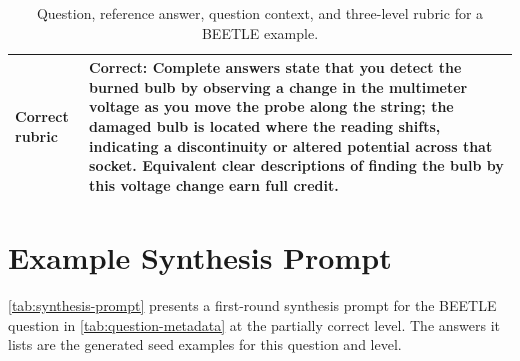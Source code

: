 \begin{table}[t]
{\begin{tabular}{@{}p{}p{}@{}}
    \hline
    \raggedright\textbf{Correct rubric} &
    Correct: Complete answers state that you detect the burned bulb by observing a change in the multimeter voltage as you move the probe along the string; the damaged bulb is located where the reading shifts, indicating a discontinuity or altered potential across that socket. Equivalent clear descriptions of finding the bulb by this voltage change earn full credit. \\
    \hline
    \end{tabular}%
    }
    \caption{Question, reference answer, question context, and three-level rubric for a BEETLE example.}
    \label{tab:question-metadata}
\end{table}

\section{Example Synthesis Prompt}
\label{app:synthesis-prompt}

\autoref{tab:synthesis-prompt} presents a first-round synthesis prompt for the BEETLE question in \autoref{tab:question-metadata} at the partially correct level. The answers it lists are the generated seed examples for this question and level.

